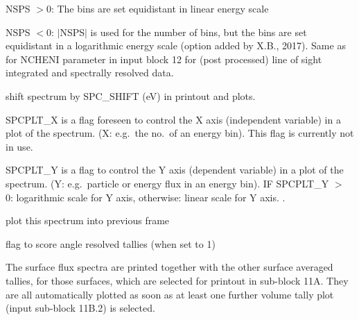 \begin{description}
        NSPS $> 0$:  The bins are set equidistant in linear energy scale

        NSPS $< 0$:  $\mid$NSPS$\mid$ is used for the number of bins, but the bins are
        set equidistant in a logarithmic energy scale (option added by X.B., 2017).
        Same as for NCHENI parameter in input block 12 for (post processed) line of
        sight integrated and spectrally resolved data.

  \item[SPC\_SHIFT] shift spectrum by SPC\_SHIFT (\si{\electronvolt}) in printout
        and plots.

  \item[SPCPLT\_X, SPCPLT\_Y] SPCPLT\_X is a flag foreseen to control the X axis
        (independent variable) in a plot of the spectrum.
        (X: e.g.\ the no.\ of an energy bin).
        This flag is currently not in use.

        SPCPLT\_Y is a flag to control the Y axis (dependent variable) in a plot of the
        spectrum.
        (Y: e.g.\ particle or energy flux in an energy bin).
        IF SPCPLT\_Y $>$ 0: logarithmic scale for Y axis, otherwise: linear scale for Y
        axis.
        .

  \item[SPCPLT\_SAME] plot this spectrum into previous frame
  \item[ISPCOPT] flag to score angle resolved tallies (when set to 1)
\end{description}
The surface flux spectra are printed together with the other surface averaged
tallies, for those surfaces, which are selected for printout in sub-block 11A.
They are all automatically plotted as soon as at least one further volume tally
plot (input sub-block 11B.2) is selected.
